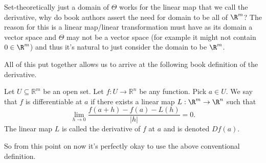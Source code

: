 		\begin{point}
			Set-theoretically just a domain of $\Theta$ works for the linear map that we call the derivative, why do book authors assert the need for domain to be all of $\R^m$? The reason for this is a linear map/linear transformation must have as its domain a vector space and $\Theta$ may not be a vector space (for example it might not contain $0 \in \R^m$) and thus it's natural to just consider the domain to be $\R^m$.
		\end{point}

		
		
		All of this put together allows us to arrive at the following book definition of the derivative.
		
		
		\begin{definition}
			Let $U \subseteq \mathbb{R}^m$ be an open set. Let $f : U \to \mathbb{R}^n$ be any function. Pick $a \in U$. We say that $f$ is differentiable at $a$ if there exists a linear map $L : \R^m \to \R^n$ such that $$\lim_{h \to 0}\frac{f(a+h)-f(a)-L(h)}{|h|}=0.$$ The linear map $L$ is called the derivative of $f$ at $a$ and is denoted $Df(a)$.
		\end{definition}
		
		So from this point on now it's perfectly okay to use the above conventional definition.
		
		
		